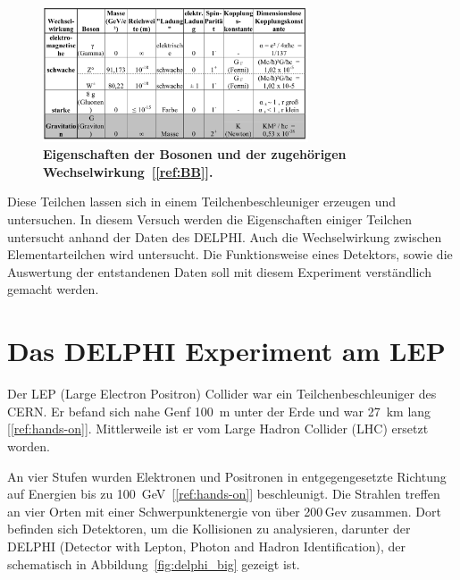 \documentclass[a4paper,ngerman]{scrartcl}
\begin{document}
\begin{figure}[tbh!]
\centering
\includegraphics[width=0.7\textwidth]{abbildungen/bosonen.png}
\caption{\textbf{Eigenschaften der Bosonen und der zugehörigen Wechselwirkung~[\ref{ref:BB}].} 
}
\label{fig:bosonen}
\end{figure}

Diese Teilchen lassen sich in einem Teilchenbeschleuniger erzeugen und untersuchen.
In diesem Versuch werden die Eigenschaften einiger Teilchen untersucht anhand der Daten des DELPHI. 
Auch die Wechselwirkung zwischen Elementarteilchen wird untersucht.
Die Funktionsweise eines Detektors, sowie die Auswertung der entstandenen Daten soll mit diesem Experiment verständlich gemacht werden.



\section{Das DELPHI Experiment am LEP}
\label{sec:delphi}

Der LEP (Large Electron Positron) Collider war ein Teilchenbeschleuniger des CERN.
Er befand sich nahe Genf \SI{100}{\metre} unter der Erde und war \SI{27}{\kilo \metre} lang [\ref{ref:hands-on}]. 
Mittlerweile ist er vom Large Hadron Collider (LHC) ersetzt worden.

An vier Stufen wurden Elektronen und Positronen in entgegengesetzte Richtung auf Energien bis zu \SI{100}{GeV}~[\ref{ref:hands-on}] beschleunigt.
Die Strahlen treffen an vier Orten mit einer Schwerpunktenergie von über 200\,Gev zusammen.
Dort befinden sich Detektoren, um die Kollisionen zu analysieren, darunter der DELPHI (Detector with Lepton, Photon and Hadron Identification), der schematisch in Abbildung~\ref{fig:delphi_big} gezeigt ist.
\end{document}
